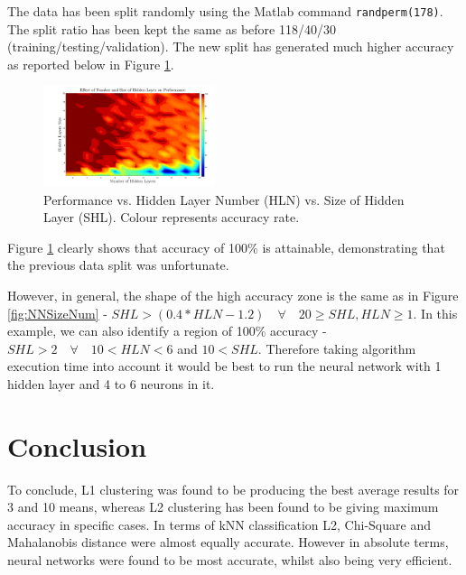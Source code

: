\documentclass[10pt,twocolumn,letterpaper]{article}
\begin{document}
The data has been split randomly using the Matlab command {\tt\small randperm(178)}. The split ratio has been kept the same as before 118/40/30 (training/testing/validation). The new split has generated much higher accuracy as reported below in Figure \ref{fig:NewSplit}.

\begin{figure}[H]
\centering
\includegraphics[width=0.45\textwidth]{../results/NN2_2}
\caption{Performance vs. Hidden Layer Number (HLN) vs. Size of Hidden Layer (SHL). Colour represents accuracy rate.
\label{fig:NewSplit}}
\end{figure}
  
Figure \ref{fig:NewSplit} clearly shows that accuracy of 100\% is attainable, demonstrating that the previous data split was unfortunate.

However, in general, the shape of the high accuracy zone is the same as in Figure \ref{fig:NNSizeNum} - $SHL > (0.4*HLN-1.2) \quad \forall \quad 20 \geq SHL, HLN \geq 1$. In this example, we can also identify a region of 100\% accuracy - $SHL > 2 \quad \forall \quad  10 < HLN < 6$ and $10 < SHL$. Therefore taking algorithm execution time into account it would be best to run the neural network with 1 hidden layer and 4 to 6 neurons in it.

\section{Conclusion}

To conclude, L1 clustering was found to be producing the best average results for 3 and 10 means, whereas L2 clustering has been found to be giving maximum accuracy in specific cases. In terms of kNN classification L2, Chi-Square and Mahalanobis distance were almost equally accurate. However in absolute terms, neural networks were found to be most accurate, whilst also being very efficient.
\end{document}
